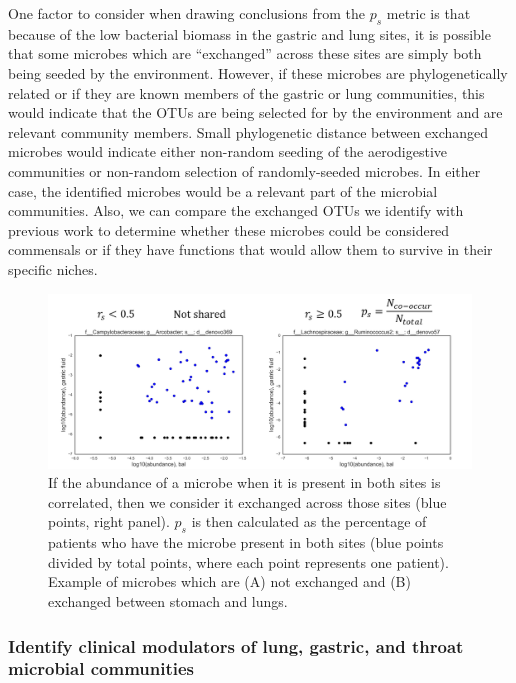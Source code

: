 \documentclass[12pt]{article}
\begin{document}
One factor to consider when drawing conclusions from the $p_s$ metric 
is that because of the low bacterial biomass in the gastric and lung 
sites, it is possible that some microbes which are ``exchanged'' across 
these sites are simply both being seeded by the environment. However, 
if these microbes are phylogenetically related or if they are known 
members of the gastric or lung communities, this would indicate that 
the OTUs are being selected for by the environment and are relevant 
community members. Small phylogenetic distance between exchanged microbes
would indicate either non-random seeding of the aerodigestive communities 
or non-random selection of randomly-seeded microbes. In either case, the
identified microbes would be a relevant part of the microbial communities.
Also, we can compare the exchanged OTUs we identify with previous work
to determine whether these microbes could be considered commensals or
if they have functions that would allow them to survive in their specific niches.

\begin{figure}
\begin{center}
    \includegraphics[scale=0.6]{sharedness_definition}
    \caption{If the abundance of a microbe when it is 
    present in both sites is correlated, then we consider it exchanged 
    across those sites (blue points, right panel). $p_s$ is then calculated as the 
    percentage of patients who have the microbe present in both sites (blue 
    points divided by total points, where each point represents one patient). 
    Example of microbes which are (A) not exchanged and (B) exchanged between stomach and lungs.}\label{fig:sharedness_defn}
\end{center}
\end{figure}

\subsubsection{Identify clinical modulators of lung, gastric, and throat microbial communities}
\end{document}
